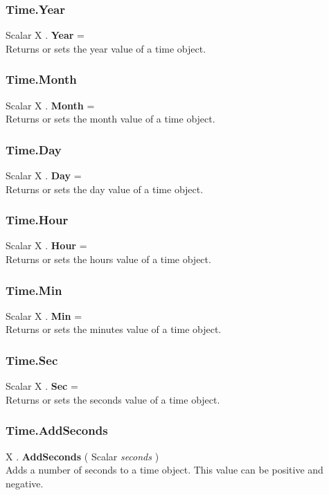 \subsubsection{Time.Year \label{F:Time:Year}}
Scalar X . \textbf{Year} = \\
Returns or sets the year value of a time object.

\subsubsection{Time.Month \label{F:Time:Month}}
Scalar X . \textbf{Month} = \\
Returns or sets the month value of a time object.

\subsubsection{Time.Day \label{F:Time:Day}}
Scalar X . \textbf{Day} = \\
Returns or sets the day value of a time object.


\subsubsection{Time.Hour \label{F:Time:Hour}}
Scalar X . \textbf{Hour} = \\
Returns or sets the hours value of a time object.


\subsubsection{Time.Min \label{F:Time:Min}}
Scalar X . \textbf{Min} = \\
Returns or sets the minutes value of a time object.


\subsubsection{Time.Sec \label{F:Time:Sec}}
Scalar X . \textbf{Sec} = \\
Returns or sets the seconds value of a time object.


\subsubsection{Time.AddSeconds \label{F:Time:AddSeconds}}
X . \textbf{AddSeconds} ( Scalar \textit{seconds} ) \\
Adds a number of seconds to a time object. This value can be positive and negative.

